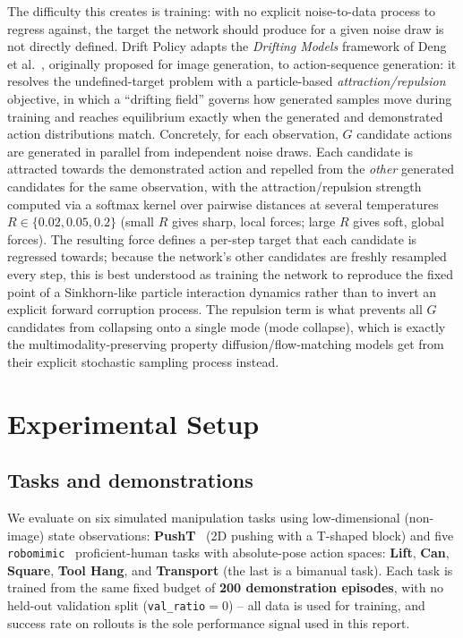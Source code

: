 \documentclass[11pt]{article}
\begin{document}
The difficulty this creates is training: with no explicit noise-to-data
process to regress against, the target the network should produce for a given
noise draw is not directly defined. Drift Policy adapts the \emph{Drifting
Models} framework of Deng et al.~\cite{deng2026drifting}, originally proposed
for image generation, to action-sequence generation: it resolves the
undefined-target problem with a particle-based \emph{attraction/repulsion}
objective, in which a ``drifting field'' governs how generated samples move
during training and reaches equilibrium exactly when the generated and
demonstrated action distributions match. Concretely, for each observation,
$G$ candidate actions are generated in parallel from independent noise draws.
Each candidate is attracted towards the demonstrated action and repelled from
the \emph{other} generated candidates for the same observation, with the
attraction/repulsion strength computed via a softmax kernel over pairwise
distances at several temperatures
$R\in\{0.02,0.05,0.2\}$ (small $R$ gives sharp, local forces; large $R$ gives
soft, global forces). The resulting force defines a per-step target that each
candidate is regressed towards; because the network's other candidates are
freshly resampled every step, this is best understood as training the network
to reproduce the fixed point of a Sinkhorn-like particle interaction dynamics
rather than to invert an explicit forward corruption process. The repulsion
term is what prevents all $G$ candidates from collapsing onto a single mode
(mode collapse), which is exactly the multimodality-preserving property
diffusion/flow-matching models get from their explicit stochastic sampling
process instead.

\section{Experimental Setup}

\subsection{Tasks and demonstrations}

We evaluate on six simulated manipulation tasks using low-dimensional
(non-image) state observations: \textbf{PushT}~\cite{florence2021ibc} (2D
pushing with a T-shaped block) and five \texttt{robomimic}~\cite{mandlekar2021robomimic}
proficient-human tasks with absolute-pose action spaces: \textbf{Lift},
\textbf{Can}, \textbf{Square}, \textbf{Tool Hang}, and \textbf{Transport}
(the last is a bimanual task). Each task is trained from the same fixed
budget of \textbf{200 demonstration episodes}, with no held-out validation
split (\texttt{val\_ratio}$=0$) -- all data is used for training, and success
rate on rollouts is the sole performance signal used in this report.
\end{document}
